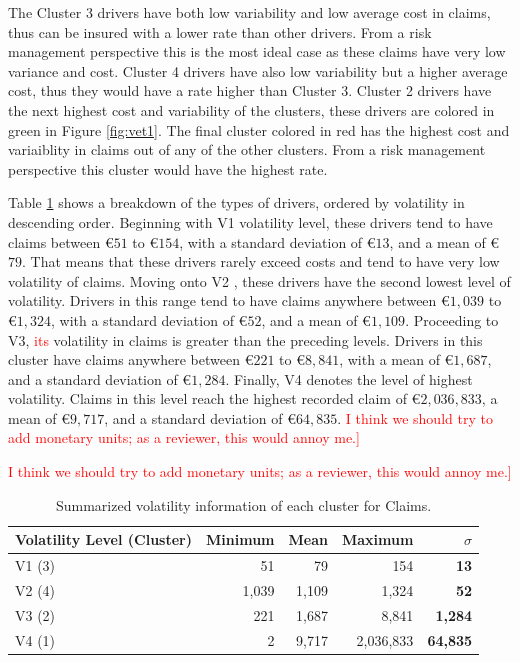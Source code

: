 \documentclass[11pt,letterpaper]{article}
\numberwithin{equation}{section}
\numberwithin{equation}{section}
\numberwithin{equation}{section}
\begin{document}
The Cluster 3 drivers have both low variability and low average cost in claims, thus can be insured with a lower rate than other drivers. From a risk management perspective this is the most ideal case as these claims have very low variance and cost. Cluster 4 drivers have also low variability but a higher average cost, thus they would have a rate higher than Cluster 3. Cluster 2 drivers have the next highest cost and variability of the clusters, these drivers are colored in green in Figure \ref{fig:vet1}. The final cluster colored in red has the highest cost and variaiblity in claims out of any of the other clusters. From a risk management perspective this cluster would have the highest rate.


Table \ref{table:volSev} shows a breakdown of the types of drivers, ordered by volatility in descending order. Beginning with V1 volatility level, these drivers tend to have claims between \euro$51$ to  \euro$ 154$, with a standard deviation of  \euro$13$, and a mean of  \euro$79$. That means that these drivers rarely exceed costs and tend to have very low volatility of claims. Moving onto V2 , these drivers have the second lowest level of volatility. Drivers in this range tend to have claims anywhere between  \euro$1,039$ to  \euro$1,324$, with a standard deviation of  \euro$52$, and a mean of  \euro$1,109$.  Proceeding to V3, \textcolor{red}{its} volatility in claims is greater than the preceding levels. Drivers in this cluster have claims anywhere between  \euro$221$ to  \euro$8,841$, with a mean of  \euro$1,687$, and a standard deviation of  \euro$1,284$. Finally, V4 denotes the level of highest volatility. Claims in this level  reach the highest recorded claim of  \euro$2,036,833$, a mean of  \euro$9,717$, and a standard deviation of  \euro$64,835$. \textcolor{red}{I think we should try to add monetary units; as a reviewer, this would annoy me.]}

 \textcolor{red}{I think we should try to add monetary units; as a reviewer, this would annoy me.]}
 
\begin{table}[!htb]
\centering
\caption{Summarized volatility information of each cluster for Claims.}
\label{table:volSev}
\begin{tabular}{lrrrr}
\hline
Volatility Level (Cluster)     & Minimum & Mean  & Maximum & $\sigma$    \\
\hline
V1 (3) & 51  & 79 & 154 & \textbf{ 13} \\
V2 (4) & 1,039  & 1,109  &  1,324 & \textbf{ 52} \\
V3 (2) & 221 & 1,687  & 8,841  &\textbf{ 1,284}  \\
V4 (1) & 2 & 9,717 & 2,036,833  & \textbf{ 64,835}\\
\hline
\end{tabular}
\end{table}
\end{document}
